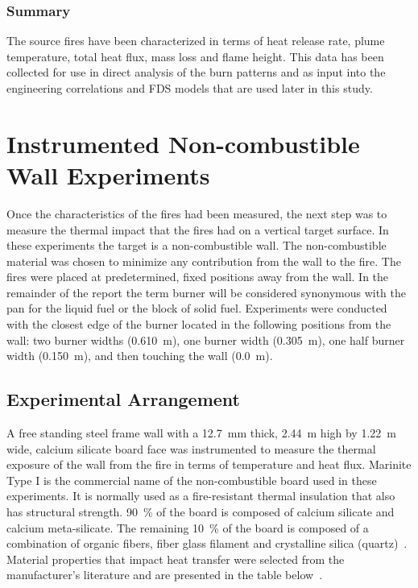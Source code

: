 \documentclass[twoside]{uocthesis}
\begin{document}
{\subsection{Summary}

The source fires have been characterized in terms of heat release rate, plume temperature, total heat flux, mass loss and flame height.  This data has been collected for use in direct analysis of the burn patterns and as input into the engineering correlations and FDS models that are used later in this study.



\chapter{Instrumented Non-combustible Wall Experiments}

Once the characteristics of the fires had been measured, the next step was to measure the thermal impact that the fires had on a vertical target surface.  In these experiments the target is a non-combustible wall. The non-combustible material was chosen to minimize any contribution from the wall to the fire.  The fires were placed at predetermined, fixed positions away from the wall.  In the remainder of the report the term burner will be considered synonymous with the pan for the liquid fuel or the block of solid fuel. Experiments were conducted with the closest edge of the burner located in the following positions from the wall: two burner widths (0.610~m), one burner width (0.305~m), one half burner width (0.150~m), and then touching the wall (0.0~m).


\section{Experimental Arrangement}

A free standing steel frame wall with a 12.7~mm thick, 2.44~m high by 1.22~m wide, calcium silicate board face was instrumented to measure the thermal exposure of the wall from the fire in terms of temperature and heat flux. Marinite Type I is the commercial name of the non-combustible board used in these experiments.  It is normally used as a fire-resistant thermal insulation that also has structural strength. 90~\% of the board is composed of calcium silicate and calcium meta-silicate.  The remaining 10~\% of the board is composed of a combination of organic fibers, fiber glass filament and crystalline silica (quartz)~\cite{BNZ:MSDS}.  Material properties that impact heat transfer were selected from the manufacturer's literature and are presented in the table below~\cite{Marinite:1997}.

}
\end{document}
